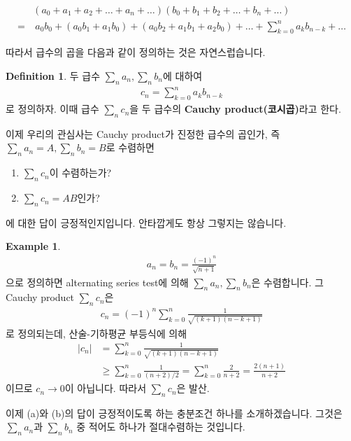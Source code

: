 \documentclass[12pt]{article}
\theoremstyle{definition}
\newtheorem{defn}[thm]{Definition}
\newtheorem*{ex}{Example}
\newcommand{\abs}[1]{\left\vert#1\right\vert}
\begin{document}
\begin{align*}
	&(a_0 + a_1 + a_2 + \ldots + a_n + \ldots)(b_0 + b_1 + b_2 + \ldots + b_n + \ldots)\\
	= &\: a_0 b_0 + (a_0 b_1 + a_1 b_0) + (a_0 b_2 + a_1 b_1 + a_2 b_0) + \ldots + \sum_{k=0}^n a_k b_{n-k} + \ldots
\end{align*}

따라서 급수의 곱을 다음과 같이 정의하는 것은 자연스럽습니다.

\begin{defn}
	두 급수 \(\sum_n a_n, \sum_n b_n\)에 대하여
	\begin{gather*}
		c_n = \sum_{k=0}^{n} a_k b_{n-k}
	\end{gather*}
	로 정의하자. 이때 급수 \(\sum_n c_n\)을 두 급수의 \textbf{Cauchy product(코시곱)}라고 한다.
\end{defn}

이제 우리의 관심사는 Cauchy product가 진정한 급수의 곱인가, 즉 \(\sum_n a_n = A, \sum_n b_n = B\)로 수렴하면
\begin{enumerate}[label=(\alph*), leftmargin=2\parindent]
	\item
	\(\sum_n c_n\)이 수렴하는가?
	\item
	\(\sum_n c_n = AB\)인가?
\end{enumerate}
에 대한 답이 긍정적인지입니다. 안타깝게도 항상 그렇지는 않습니다.

\begin{ex}
	\begin{gather*}
		a_n = b_n = \frac{(-1)^n}{\sqrt{n+1}}
	\end{gather*}
	으로 정의하면 alternating series test에 의해 \(\sum_n a_n, \sum_n b_n\)은 수렴합니다. 그 Cauchy product \(\sum_n c_n\)은
	\begin{gather*}
		c_n = (-1)^n \sum_{k=0}^{n} \frac{1}{\sqrt{(k+1)(n-k+1)}}
	\end{gather*}
	로 정의되는데, 산술-기하평균 부등식에 의해
	\begin{align*}
		\abs{c_n} &= \sum_{k=0}^{n} \frac{1}{\sqrt{(k+1)(n-k+1)}}\\
		& \ge \sum_{k=0}^{n} \frac{1}{(n+2)/2} = \sum_{k=0}^{n} \frac{2}{n+2} = \frac{2(n+1)}{n+2}
	\end{align*}
	이므로 \(c_n \rightarrow 0\)이 아닙니다. 따라서 \(\sum_n c_n\)은 발산.
\end{ex}

이제 (a)와 (b)의 답이 긍정적이도록 하는 충분조건 하나를 소개하겠습니다. 그것은 \(\sum_n a_n\)과 \(\sum_n b_n\) 중 적어도 하나가 절대수렴하는 것입니다.
\end{document}
